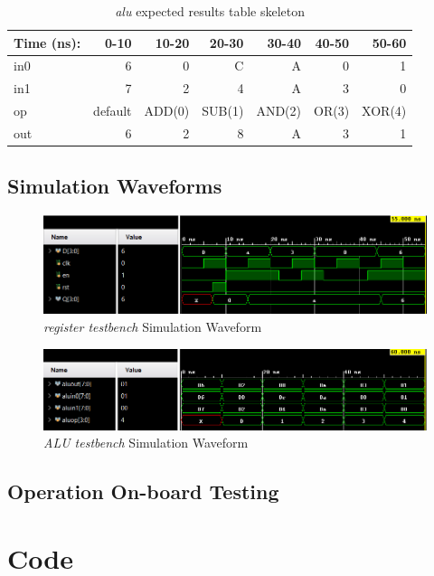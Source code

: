 \documentclass[11pt]{article}
\begin{document}
\begin{table}[ht]\centering
	\caption{\textit{alu} expected results table skeleton}
	\label{ALU:tbl:alu_ERT}\medskip
	\begin{tabular}{l|rrrrrr}
		Time (ns): & 0-10 & 10-20 & 20-30 & 30-40 & 40-50 & 50-60 \\
		\midrule
		in0 & 6  & 0 & C & A & 0 & 1 \\
		in1 & 7 & 2 & 4 & A & 3 & 0 \\
		op    & default & ADD(0) & SUB(1) & AND(2) & OR(3) & XOR(4) \\
		\midrule
		out & 6 & 2 & 8 & A & 3 & 1 \\
		\bottomrule
	\end{tabular}
\end{table}
\clearpage

\subsection*{Simulation Waveforms}
\begin{figure}[ht]\centering
	\includegraphics[width=1\textwidth]{register_test}
	\caption{\textit{register testbench} Simulation Waveform}
	\label{fig:sim_with_table}
\end{figure}

\begin{figure}[ht]\centering
	\includegraphics[width=1\textwidth]{alu_test}
	\caption{\textit{ALU testbench} Simulation Waveform}
	\label{fig:sim_with_table}
\end{figure}
\clearpage

\subsection*{Operation On-board Testing}

\clearpage
\section*{Code}
\end{document}
